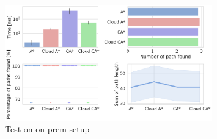 \begin{figure}[H]
    \centering
    \includegraphics[width=0.8\textwidth]{pictures/on_prem_test_subplot.png}
    \caption{Test on on-prem setup}
    \label{fig:onprem_test_rest}
\end{figure}